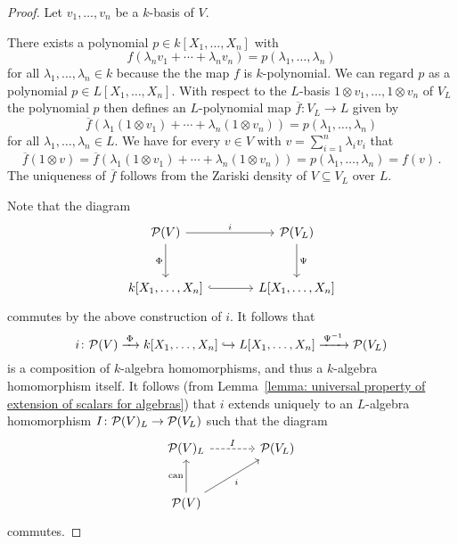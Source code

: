 \begin{proof}
    Let $v_1, \dotsc, v_n$ be a $k$-basis of $V$.
    
    There exists a polynomial $p \in k[X_1, \dotsc, X_n]$ with
    \[
        f(\lambda_n v_1 + \dotsb + \lambda_n v_n)
      = p(\lambda_1, \dotsc, \lambda_n)
    \]
    for all $\lambda_1, \dotsc, \lambda_n \in k$ because the the map $f$ is $k$-polynomial.
    We can regard $p$ as a polynomial $p \in L[X_1, \dotsc, X_n]$.
    With respect to the $L$-basis $1 \otimes v_1, \dotsc, 1 \otimes v_n$ of $V_L$ the polynomial $p$ then defines an $L$-polynomial map $\overline{f} \colon V_L \to L$ given by
    \[
        \overline{f}(\lambda_1 (1 \otimes v_1) + \dotsb + \lambda_n (1 \otimes v_n))
      = p(\lambda_1, \dotsc, \lambda_n)
    \]
    for all $\lambda_1, \dotsc, \lambda_n \in L$.
    We have for every $v \in V$ with $v = \sum_{i=1}^n \lambda_i v_i$ that
    \[
        \overline{f}(1 \otimes v)
      = \overline{f}(\lambda_1 (1 \otimes v_1) + \dotsb + \lambda_n (1 \otimes v_n))
      = p(\lambda_1, \dotsc, \lambda_n)
      = f(v) \,.
    \]
    The uniqueness of $\overline{f}$ follows from the Zariski density of $V \subseteq V_L$ over $L$.
    
    Note that the diagram
    \[
      \begin{tikzcd}[sep = large]
          \mc{P}(V)
          \arrow{r}[above]{i}
          \arrow{d}[left]{\Phi}
        & \mc{P}(V_L)
          \arrow{d}[right]{\Psi}
        \\
          k[X_1, \dotsc, X_n]
          \arrow[hook]{r}
        & L[X_1, \dotsc, X_n]
      \end{tikzcd}
    \]
    commutes by the above construction of $i$.
    It follows that
    \[
                                  i
      \colon                      \mathcal{P}(V)
      \xrightarrow{\,\Phi\,}      k[X_1, \dotsc, X_n]
      \hookrightarrow             L[X_1, \dotsc, X_n]
      \xrightarrow{\,\Psi^{-1}\,} \mathcal{P}(V_L)
    \]
    is a composition of $k$-algebra homomorphisms, and thus a $k$-algebra homomorphism itself.
    It follows (from Lemma~\ref{lemma: universal property of extension of scalars for algebras}) that $i$ extends uniquely to an $L$-algebra homomorphism $I \colon \mathcal{P}(V)_L \to \mathcal{P}(V_L)$ such that the diagram
    \[
      \begin{tikzcd}[sep = large]
          \mc{P}(V)_L
          \arrow[dashed]{r}[above]{I}
        & \mc{P}(V_L)
        \\
          \mc{P}(V)
          \arrow{u}[left]{\can}
          \arrow{ru}[below right]{i}
        & {}
      \end{tikzcd}
    \]
    commutes.
    

\end{proof}
